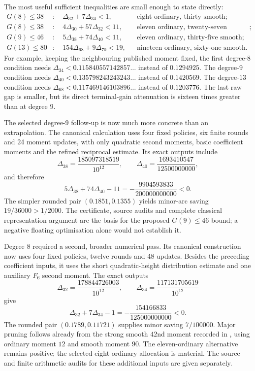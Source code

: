 \documentclass[11pt,letterpaper]{article}
\numberwithin{equation}{section}
\begin{document}
The most useful sufficient inequalities are small enough to state directly:
\begin{align*}
 G(8)\le38 &: \quad \Delta_{32}+7\Delta_{34}<1,
                  &&\text{eight ordinary, thirty smooth};\\
 G(8)\le38 &: \quad 4\Delta_{30}+57\Delta_{32}<11,
                  &&\text{eleven ordinary, twenty-seven smooth};\\
 G(9)\le46 &: \quad 5\Delta_{38}+74\Delta_{40}<11,
                  &&\text{eleven ordinary, thirty-five smooth};\\
 G(13)\le80 &: \quad154\Delta_{68}+9\Delta_{70}<19,
                  &&\text{nineteen ordinary, sixty-one smooth}.
\end{align*}
For example, keeping the neighbouring published moment fixed, the first
degree-$8$ condition needs $\Delta_{34}<0.115840557142857\ldots$ instead
of $0.1294925$. The degree-$9$ condition needs
$\Delta_{40}<0.135798243243243\ldots$ instead of $0.1420569$.
The degree-$13$ condition needs
$\Delta_{68}<0.117469146103896\ldots$ instead of $0.1203776$.
The last raw gap is smaller, but its direct terminal-gain attenuation is
sixteen times greater than at degree $9$.

The selected degree-$9$ follow-up is now much more concrete than an
extrapolation. The canonical calculation uses four fixed policies, six finite
rounds and 24 moment updates, with only quadratic second moments, basic
coefficient moments and the refined reciprocal estimate. Its exact outputs
include
\[
 \Delta_{38}=\frac{185097318519}{10^{12}},\qquad
 \Delta_{40}=\frac{1693410547}{12500000000},
\]
and therefore
\[
 5\Delta_{38}+74\Delta_{40}-11
       =-\frac{9904593833}{200000000000}<0.
\]
The simpler rounded pair $(0.1851,0.1355)$ yields minor-arc saving
$19/36000>1/2000$. The certificate, source audits and complete classical
representation argument are the basis for the proposed $G(9)\le46$
bound; a negative floating optimisation alone would not establish it.

Degree $8$ required a second, broader numerical pass. Its canonical
construction now uses four fixed policies, twelve rounds and 48 updates.
Besides the preceding coefficient inputs, it uses the short quadratic-height
distribution estimate and one auxiliary $F_6$ second moment. The exact outputs
\[
 \Delta_{32}=\frac{178844726003}{10^{12}},\qquad
 \Delta_{34}=\frac{117131705619}{10^{12}}
\]
give
\[
 \Delta_{32}+7\Delta_{34}-1
       =-\frac{154166833}{125000000000}<0.
\]
The rounded pair $(0.1789,0.11721)$ supplies minor saving $7/100000$.
Major pruning follows already from the strong smooth $42$nd moment recorded
in \cite[Table~2 and (4.2)]{W16}, using ordinary moment $12$ and smooth
moment $90$. The eleven-ordinary alternative remains positive; the selected
eight-ordinary allocation is material. The source and finite arithmetic
audits for these additional inputs are given separately.
\end{document}
